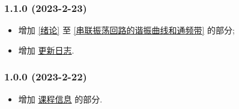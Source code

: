 \subsubsection*{1.1.0 (2023-2-23)}
\begin{itemize}
    \item 增加 \ref{绪论} 至 \ref{串联振荡回路的谐振曲线和通频带} 的部分;
    \item 增加 \hyperref[更新日志]{更新日志}.
\end{itemize}

\subsubsection*{1.0.0 (2023-2-22)}
\begin{itemize}
    \item 增加 \hyperref[课程信息]{课程信息} 的部分.
\end{itemize}
